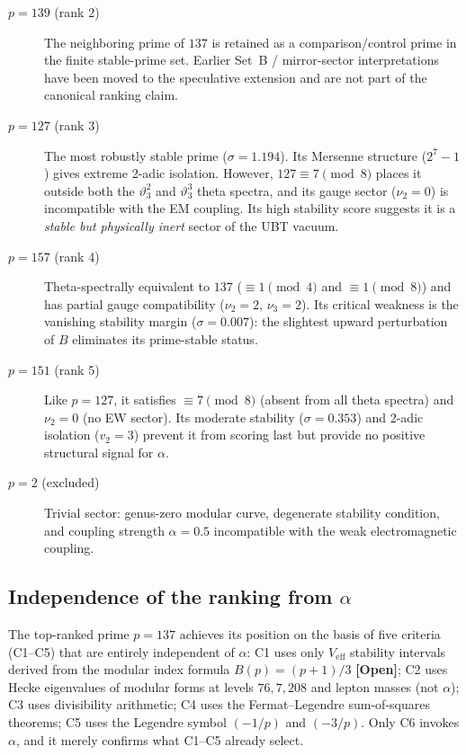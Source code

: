 \documentclass[12pt,a4paper]{article}
\theoremstyle{definition}
\theoremstyle{remark}
\newcommand{\OPEN}{\textbf{[Open]}}
\begin{document}
\begin{description}
  \item[$p = 139$ (rank 2)] The neighboring prime of $137$ is retained
        as a comparison/control prime in the finite stable-prime set.  Earlier
        Set~B / mirror-sector interpretations have been moved to the
        speculative extension and are not part of the canonical ranking claim.
  \item[$p = 127$ (rank 3)] The most robustly stable prime ($\sigma = 1.194$).
        Its Mersenne structure ($2^7 - 1$) gives extreme 2-adic isolation.
        However, $127 \equiv 7 \pmod{8}$ places it outside both the
        $\vartheta_3^2$ and $\vartheta_3^3$ theta spectra, and its gauge sector
        ($\nu_2 = 0$) is incompatible with the EM coupling.  Its high stability
        score suggests it is a \emph{stable but physically inert} sector of the
        UBT vacuum.
  \item[$p = 157$ (rank 4)] Theta-spectrally equivalent to $137$
        ($\equiv 1 \pmod{4}$ and $\equiv 1 \pmod{8}$) and has partial gauge
        compatibility ($\nu_2 = 2$, $\nu_3 = 2$).  Its critical weakness is
        the vanishing stability margin ($\sigma = 0.007$): the slightest upward
        perturbation of $B$ eliminates its prime-stable status.
  \item[$p = 151$ (rank 5)] Like $p = 127$, it satisfies $\equiv 7
        \pmod{8}$ (absent from all theta spectra) and $\nu_2 = 0$ (no EW
        sector).  Its moderate stability ($\sigma = 0.353$) and 2-adic
        isolation ($v_2 = 3$) prevent it from scoring last but provide no
        positive structural signal for $\alpha$.
  \item[$p = 2$ (excluded)] Trivial sector: genus-zero modular curve,
        degenerate stability condition, and coupling strength $\alpha = 0.5$
        incompatible with the weak electromagnetic coupling.
\end{description}

\subsection{Independence of the ranking from $\alpha$}

The top-ranked prime $p = 137$ achieves its position on the basis of five
criteria (C1–C5) that are entirely independent of $\alpha$:
C1 uses only $V_{\mathrm{eff}}$ stability intervals derived from the modular
index formula $B(p) = (p+1)/3$ \OPEN; C2 uses Hecke eigenvalues of modular
forms at levels $76, 7, 208$ and lepton masses (not $\alpha$); C3 uses
divisibility arithmetic; C4 uses the Fermat--Legendre sum-of-squares theorems;
C5 uses the Legendre symbol $(-1/p)$ and $(-3/p)$.
Only C6 invokes $\alpha$, and it merely confirms what C1–C5 already select.
\end{document}
